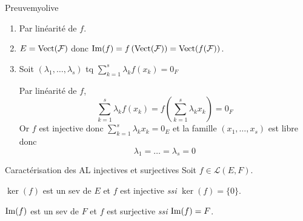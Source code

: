     \begin{demo}{Preuve}{myolive}
        \begin{enumerate}
            \item Par linéarité de $f$.
            \item $ E = \operatorname{Vect}(\mathcal{F})$ donc $\operatorname{Im}(f) = f \left( \operatorname{Vect}(\mathcal{F})\right) = \operatorname{Vect}(f(\mathcal{F}))$.
            \item Soit $(\lambda_1 ,\ldots,\lambda_s)$ tq $\sum\limits_{k=1}^s \lambda_k f(x_k) = 0_F$
    
            Par linéarité de $f$, \[ \sum\limits_{k=1}^s \lambda_k f(x_k) = f \left(\sum\limits_{k=1}^s \lambda_k x_k\right)= 0_F \] 
            Or $f$ est injective donc $\sum\limits_{k=1}^s \lambda_k x_k = 0_E$ et la famille $(x_1,\ldots,x_s)$ est libre donc 
            \[ \lambda_1 = \ldots = \lambda_s = 0 \]
        \end{enumerate}
    \end{demo}

    \begin{prop}{Caractérisation des AL injectives et surjectives}{}
        Soit $f \in \mathcal{L}(E,F)$.
        
        \begin{alors}
            \item $\ker(f)$ est un sev de $E$ et $f$ est injective \textit{ssi} $\ker(f) = \{0\}$.
            \item $\operatorname{Im}(f)$ est un sev de $F$ et $f$ est surjective \textit{ssi} $\operatorname{Im}(f) = F$.
        \end{alors}
    \end{prop}

